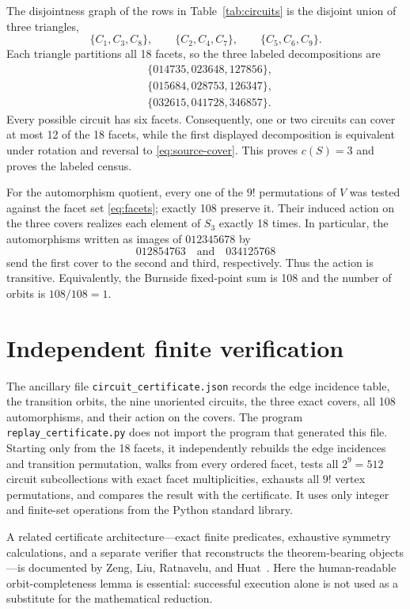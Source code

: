 \documentclass[11pt]{article}
\begin{document}
The disjointness graph of the rows in Table~\ref{tab:circuits} is the disjoint
union of three triangles,
\[
\{C_1,C_3,C_8\},\qquad
\{C_2,C_4,C_7\},\qquad
\{C_5,C_6,C_9\}.
\]
Each triangle partitions all 18 facets, so the three labeled decompositions
are
\begin{align*}
&\{014735,023648,127856\},\\
&\{015684,028753,126347\},\\
&\{032615,041728,346857\}.
\end{align*}
Every possible circuit has six facets.  Consequently, one or two circuits can
cover at most 12 of the 18 facets, while the first displayed decomposition is
equivalent under rotation and reversal to \eqref{eq:source-cover}.  This proves
$c(S)=3$ and proves the labeled census.

For the automorphism quotient, every one of the $9!$ permutations of $V$ was
tested against the facet set \eqref{eq:facets}; exactly 108 preserve it.  Their
induced action on the three covers realizes each element of $S_3$ exactly 18
times.  In particular, the automorphisms written as images of
$012345678$ by
\[
012854763 \quad\text{and}\quad 034125768
\]
send the first cover to the second and third, respectively.  Thus the action
is transitive.  Equivalently, the Burnside fixed-point sum is 108 and the
number of orbits is $108/108=1$.

\section{Independent finite verification}

The ancillary file \texttt{circuit\_certificate.json} records the edge
incidence table, the transition orbits, the nine unoriented circuits, the
three exact covers, all 108 automorphisms, and their action on the covers.
The program \texttt{replay\_certificate.py} does not import the program that
generated this file.  Starting only from the 18 facets, it independently
rebuilds the edge incidences and transition permutation, walks from every
ordered facet, tests all $2^9=512$ circuit subcollections with exact facet
multiplicities, exhausts all $9!$ vertex permutations, and compares the
result with the certificate.  It uses only integer and finite-set operations
from the Python standard library.

A related certificate architecture---exact finite predicates, exhaustive
symmetry calculations, and a separate verifier that reconstructs the
theorem-bearing objects---is documented by Zeng, Liu, Ratnavelu, and
Huat~\cite{ZengEtAl2026}.  Here the human-readable orbit-completeness lemma is
essential: successful execution alone is not used as a substitute for the
mathematical reduction.
\end{document}

